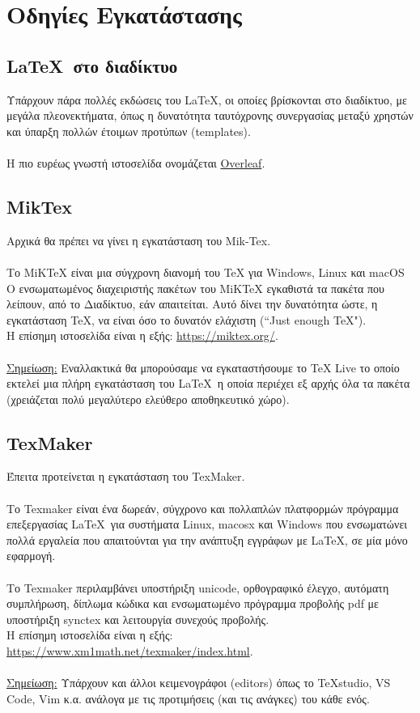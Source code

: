 \documentclass[a4paper, 12pt, oneside, xelatex, final]{article}
\begin{document}
\section{Οδηγίες Εγκατάστασης}
		\subsection{\LaTeX\ στο διαδίκτυο}
		\noindent Υπάρχουν πάρα πολλές εκδώσεις του \LaTeX, οι οποίες βρίσκονται στο διαδίκτυο, με μεγάλα πλεονεκτήματα, όπως η δυνατότητα ταυτόχρονης συνεργασίας μεταξύ χρηστών και ύπαρξη πολλών έτοιμων προτύπων (templates).\\
		\\
		Η πιο ευρέως γνωστή ιστοσελίδα ονομάζεται \href{http://www.overleaf.com}{Overleaf}.
		
		\subsection{ΜikTex}
		\noindent Αρχικά θα πρέπει να γίνει η εγκατάσταση του Mik-Tex.\\
		\\
		Το MiKTeX είναι μια σύγχρονη διανομή του TeX για Windows, Linux και macOS\\
		Ο ενσωματωμένος διαχειριστής πακέτων του MiKTeX εγκαθιστά τα πακέτα που λείπουν, από το Διαδίκτυο, εάν απαιτείται. Αυτό δίνει την δυνατότητα ώστε, η εγκατάσταση TeX, να είναι όσο το δυνατόν ελάχιστη (``Just enough TeX").
		\\
		Η επίσημη ιστοσελίδα είναι η εξής: \url{https://miktex.org/}. \\ \\
		\underline{Σημείωση:} Εναλλακτικά θα μπορούσαμε να εγκαταστήσουμε το TeX Live το οποίο εκτελεί μια πλήρη εγκατάσταση του \LaTeX\ η οποία περιέχει εξ αρχής όλα τα πακέτα (χρειάζεται πολύ μεγαλύτερο ελεύθερο αποθηκευτικό χώρο).
		
		\subsection{TexMaker}
		\noindent Έπειτα προτείνεται η εγκατάσταση του TexMaker.\\
		\\
		Το Texmaker είναι ένα δωρεάν, σύγχρονο και πολλαπλών πλατφορμών πρόγραμμα επεξεργασίας \LaTeX\ για συστήματα Linux, macosx και Windows που ενσωματώνει πολλά εργαλεία που απαιτούνται για την ανάπτυξη εγγράφων με \LaTeX, σε μία μόνο εφαρμογή.\\
		\\
		Το Texmaker περιλαμβάνει υποστήριξη unicode, ορθογραφικό έλεγχο, αυτόματη συμπλήρωση, δίπλωμα κώδικα και ενσωματωμένο πρόγραμμα προβολής pdf με υποστήριξη synctex και λειτουργία συνεχούς προβολής.\\
		Η επίσημη ιστοσελίδα είναι η εξής: \url{https://www.xm1math.net/texmaker/index.html}.\\ \\
		\underline{Σημείωση:} Υπάρχουν και άλλοι κειμενογράφοι (editors) όπως το TeXstudio, VS Code, Vim κ.α. ανάλογα με τις προτιμήσεις (και τις ανάγκες) του κάθε ενός.
		
\end{document}
